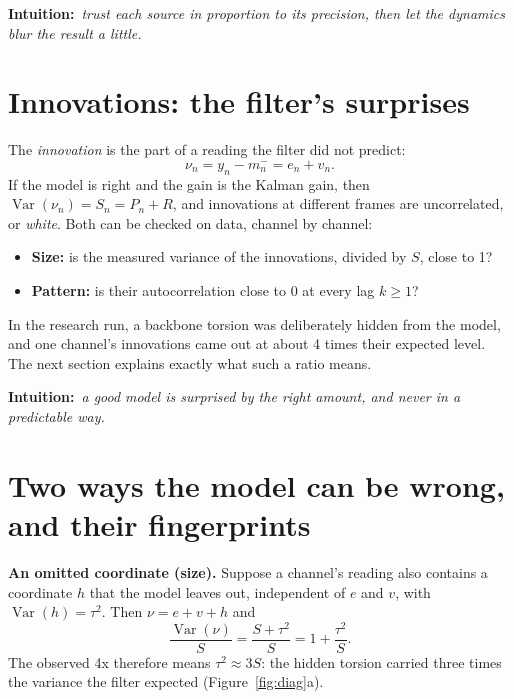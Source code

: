 \documentclass[11pt]{article}
\newcommand{\intuition}[1]{\begin{intuitionbox}\textsf{\textbf{Intuition:}}\ \textit{#1}%
  \end{intuitionbox}}
\newcommand{\Var}{\operatorname{Var}}
\begin{document}
\intuition{trust each source in proportion to its precision, then let the dynamics blur the
  result a little.}

\section{Innovations: the filter's surprises}\label{sec:innovations}

The \emph{innovation} is the part of a reading the filter did not predict:
\[
  \nu_n = y_n - m^-_n = e_n + v_n .
\]
If the model is right and the gain is the Kalman gain, then $\Var(\nu_n) = S_n = P_n + R$, and
innovations at different frames are uncorrelated, or \emph{white}. Both can be checked on
data, channel by channel:
\begin{itemize}
  \item \textbf{Size:} is the measured variance of the innovations, divided by $S$, close
    to 1?
  \item \textbf{Pattern:} is their autocorrelation close to 0 at every lag $k \ge 1$?
\end{itemize}
In the research run, a backbone torsion was deliberately hidden from the model, and one
channel's innovations came out at about 4 times their expected level. The next section
explains exactly what such a ratio means.

\intuition{a good model is surprised by the right amount, and never in a predictable way.}

\section{Two ways the model can be wrong, and their fingerprints}\label{sec:fingerprints}

\textbf{An omitted coordinate (size).} Suppose a channel's reading also contains a coordinate
$h$ that the model leaves out, independent of $e$ and $v$, with $\Var(h) = \tau^2$. Then
$\nu = e + v + h$ and
\[
  \frac{\Var(\nu)}{S} = \frac{S + \tau^2}{S} = 1 + \frac{\tau^2}{S}.
\]
The observed 4x therefore means $\tau^2 \approx 3S$: the hidden torsion carried three times
the variance the filter expected (Figure~\ref{fig:diag}a).
\end{document}

